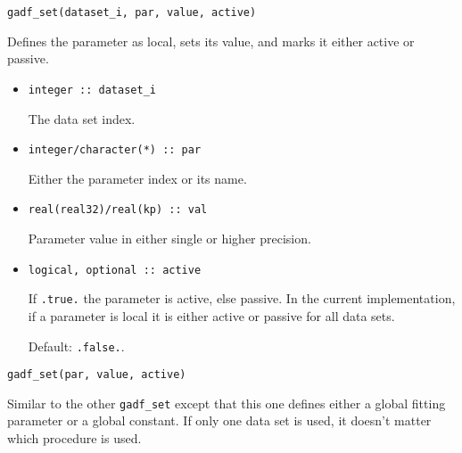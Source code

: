 \documentclass{article}
\begin{document}
\begin{verbatim}
gadf_set(dataset_i, par, value, active)
\end{verbatim}
Defines the parameter as local, sets its value, and marks it either active or passive.
\begin{itemize}
\item
\begin{verbatim}
integer :: dataset_i
\end{verbatim}
  The data set index.
\item
\begin{verbatim}
integer/character(*) :: par
\end{verbatim}
  Either the parameter index or its name.
\item
\begin{verbatim}
real(real32)/real(kp) :: val
\end{verbatim}
  Parameter value in either single or higher precision.
\item
\begin{verbatim}
logical, optional :: active
\end{verbatim}
  If \verb+.true.+ the parameter is active, else passive. In the current implementation, if a parameter is local it is either active or passive for all data sets.

  Default: \verb+.false.+.
\end{itemize}

\begin{verbatim}
gadf_set(par, value, active)
\end{verbatim}
Similar to the other \verb+gadf_set+ except that this one defines either a global fitting parameter or a global constant. If only one data set is used, it doesn't matter which procedure is used.
\end{document}
